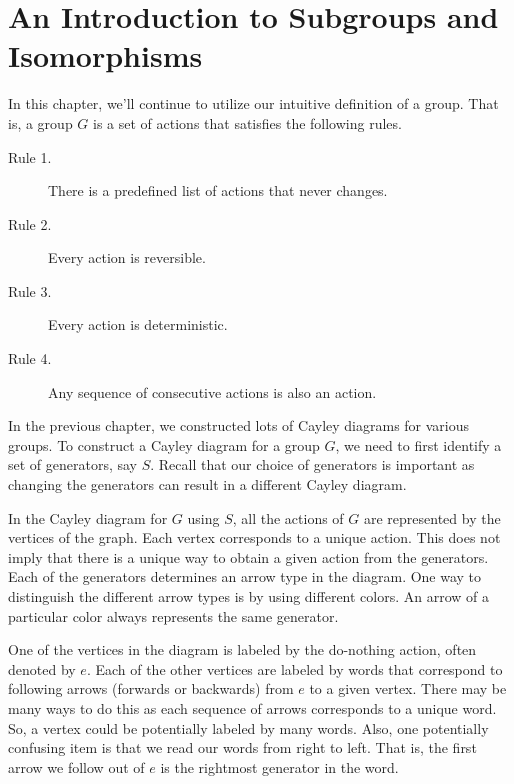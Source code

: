 \chapter{An Introduction to Subgroups and Isomorphisms}
\label{chapter:intro_subgroups_isomorphisms}
\thispagestyle{empty}

In this chapter, we'll continue to utilize our intuitive definition of a group.  That is, a group $G$ is a set of actions that satisfies the following rules.

\begin{description}
\item[Rule 1.] There is a predefined list of actions that never changes.
\item[Rule 2.] Every action is reversible.
\item[Rule 3.] Every action is deterministic.
\item[Rule 4.] Any sequence of consecutive actions is also an action.
\end{description}

In the previous chapter, we constructed lots of Cayley diagrams for various groups.  To construct a Cayley diagram for a group $G$, we need to first identify a set of generators, say $S$.  Recall that our choice of generators is important as changing the generators can result in a different Cayley diagram.  

In the Cayley diagram for $G$ using $S$, all the actions of $G$ are represented by the vertices of the graph.  Each vertex corresponds to a unique action.  This does not imply that there is a unique way to obtain a given action from the generators.  Each of the generators determines an arrow type in the diagram.  One way to distinguish the different arrow types is by using different colors.  An arrow of a particular color always represents the same generator.

One of the vertices in the diagram is labeled by the do-nothing action, often denoted by $e$.  Each of the other vertices are labeled by words that correspond to following arrows (forwards or backwards) from $e$ to a given vertex.  There may be many ways to do this as each sequence of arrows corresponds to a unique word.  So, a vertex could be potentially labeled by many words.  Also, one potentially confusing item is that we read our words from right to left.  That is, the first arrow we follow out of $e$ is the rightmost generator in the word.

